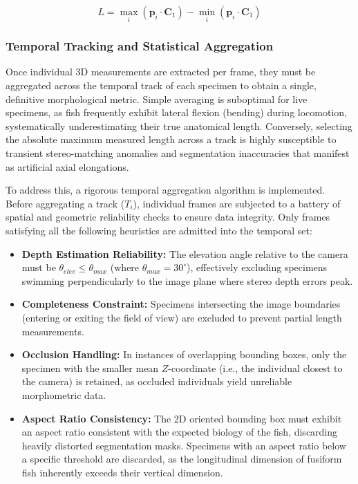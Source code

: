 \documentclass[utf8]{FrontiersinHarvard} %
\begin{document}
\begin{equation}
\label{eq::fish_length}
L = \max_{i}\left( \mathbf{p}_i \cdot \mathbf{C}_1 \right) - \min_{i}\left( \mathbf{p}_i \cdot \mathbf{C}_1 \right)
\end{equation}

 

\subsubsection{Temporal Tracking and Statistical Aggregation}\label{subsec::aggregation}

Once individual 3D measurements are extracted per frame, they must be aggregated across the temporal track of each specimen to obtain a single, definitive morphological metric. Simple averaging is suboptimal for live specimens, as fish frequently exhibit lateral flexion (bending) during locomotion, systematically underestimating their true anatomical length. Conversely, selecting the absolute maximum measured length across a track is highly susceptible to transient stereo-matching anomalies and segmentation inaccuracies that manifest as artificial axial elongations.

To address this, a rigorous temporal aggregation algorithm is implemented. Before aggregating a track ($T_i$), individual frames are subjected to a battery of spatial and geometric reliability checks to ensure data integrity. Only frames satisfying all the following heuristics are admitted into the temporal set:
\begin{itemize}
    \item \textbf{Depth Estimation Reliability:} The elevation angle relative to the camera must be $\theta_{elev} \le \theta_{max}$ (where $\theta_{max} = 30^\circ$), effectively excluding specimens swimming perpendicularly to the image plane where stereo depth errors peak.
    
    \item \textbf{Completeness Constraint:} Specimens intersecting the image boundaries (entering or exiting the field of view) are excluded to prevent partial length measurements.
    
    \item \textbf{Occlusion Handling:} In instances of overlapping bounding boxes, only the specimen with the smaller mean $Z$-coordinate (i.e., the individual closest to the camera) is retained, as occluded individuals yield unreliable morphometric data.
    
    \item \textbf{Aspect Ratio Consistency:} The 2D oriented bounding box must exhibit an aspect ratio consistent with the expected biology of the fish, discarding heavily distorted segmentation masks. Specimens with an aspect ratio below a specific threshold are discarded, as the longitudinal dimension of fusiform fish inherently exceeds their vertical dimension.
\end{itemize}
\end{document}
